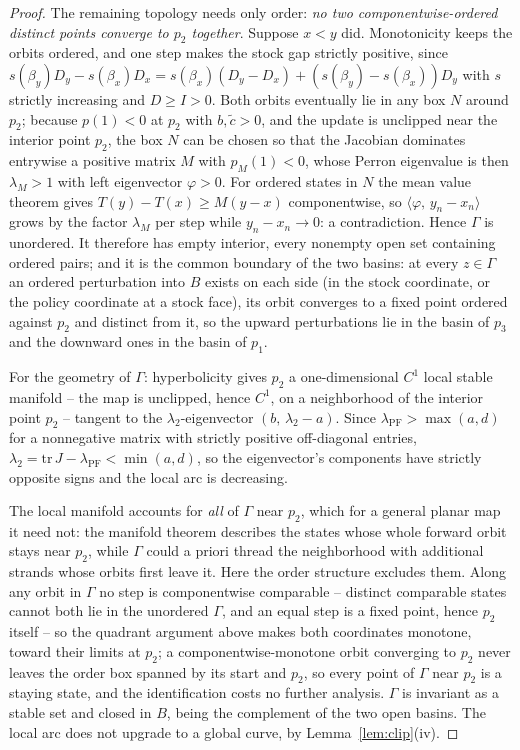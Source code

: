\documentclass[11pt]{article}
\theoremstyle{definition}
\theoremstyle{remark}
\numberwithin{equation}{section}
\begin{document}
\begin{proof}
The remaining topology needs only order: \emph{no two componentwise-ordered distinct points converge to $p_2$ together}. Suppose $x < y$ did. Monotonicity keeps the orbits ordered, and one step makes the stock gap strictly positive, since $s(\beta_y)D_y - s(\beta_x)D_x = s(\beta_x)(D_y - D_x) + (s(\beta_y) - s(\beta_x))D_y$ with $s$ strictly increasing and $D \ge I > 0$. Both orbits eventually lie in any box $N$ around $p_2$; because $p(1) < 0$ at $p_2$ with $b, \tilde c > 0$, and the update is unclipped near the interior point $p_2$, the box $N$ can be chosen so that the Jacobian dominates entrywise a positive matrix $M$ with $p_M(1) < 0$, whose Perron eigenvalue is then $\lambda_M > 1$ with left eigenvector $\varphi > 0$. For ordered states in $N$ the mean value theorem gives $T(y) - T(x) \ge M(y - x)$ componentwise, so $\langle\varphi,\, y_n - x_n\rangle$ grows by the factor $\lambda_M$ per step while $y_n - x_n \to 0$: a contradiction. Hence $\Gamma$ is unordered. It therefore has empty interior, every nonempty open set containing ordered pairs; and it is the common boundary of the two basins: at every $z \in \Gamma$ an ordered perturbation into $B$ exists on each side (in the stock coordinate, or the policy coordinate at a stock face), its orbit converges to a fixed point ordered against $p_2$ and distinct from it, so the upward perturbations lie in the basin of $p_3$ and the downward ones in the basin of $p_1$.

For the geometry of $\Gamma$: hyperbolicity gives $p_2$ a one-dimensional $C^1$ local stable manifold -- the map is unclipped, hence $C^1$, on a neighborhood of the interior point $p_2$ -- tangent to the $\lambda_2$-eigenvector $(b,\, \lambda_2 - a)$. Since $\lambda_{\mathrm{PF}} > \max(a,d)$ for a nonnegative matrix with strictly positive off-diagonal entries, $\lambda_2 = \mathrm{tr}\,J - \lambda_{\mathrm{PF}} < \min(a,d)$, so the eigenvector's components have strictly opposite signs and the local arc is decreasing.

The local manifold accounts for \emph{all} of $\Gamma$ near $p_2$, which for a general planar map it need not: the manifold theorem describes the states whose whole forward orbit stays near $p_2$, while $\Gamma$ could a priori thread the neighborhood with additional strands whose orbits first leave it. Here the order structure excludes them. Along any orbit in $\Gamma$ no step is componentwise comparable -- distinct comparable states cannot both lie in the unordered $\Gamma$, and an equal step is a fixed point, hence $p_2$ itself -- so the quadrant argument above makes both coordinates monotone, toward their limits at $p_2$; a componentwise-monotone orbit converging to $p_2$ never leaves the order box spanned by its start and $p_2$, so every point of $\Gamma$ near $p_2$ is a staying state, and the identification costs no further analysis. $\Gamma$ is invariant as a stable set and closed in $B$, being the complement of the two open basins. The local arc does not upgrade to a global curve, by Lemma~\ref{lem:clip}(iv).


\end{proof}
\end{document}
